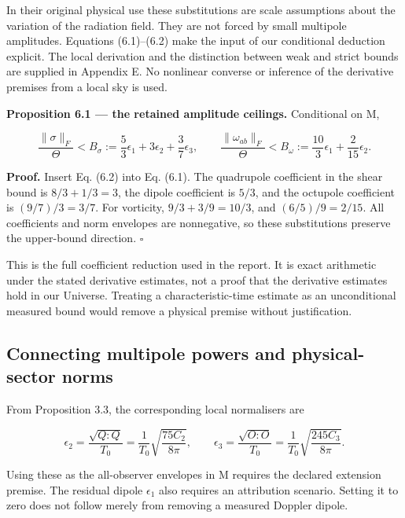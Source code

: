 \documentclass[
  11pt,
  a4paper]{article}
\begin{document}
In their original physical use these substitutions are scale assumptions about the variation of the radiation field. They are not forced by small multipole amplitudes. Equations (6.1)--(6.2) make the input of our conditional deduction explicit. The local derivation and the distinction between weak and strict bounds are supplied in Appendix E. No nonlinear converse or inference of the derivative premises from a local sky is used.

\textbf{Proposition 6.1 --- the retained amplitude ceilings.} Conditional on M,

\[
\frac{\|\sigma\|_F}{\Theta}<B_\sigma
:=\frac53\epsilon_1+3\epsilon_2+\frac37\epsilon_3,
\qquad
\frac{\|\omega_{ab}\|_F}{\Theta}<B_\omega
:=\frac{10}{3}\epsilon_1+\frac{2}{15}\epsilon_2.
\tag{6.3}
\]

\textbf{Proof.} Insert Eq. (6.2) into Eq. (6.1). The quadrupole coefficient in the shear bound is \(8/3+1/3=3\), the dipole coefficient is \(5/3\), and the octupole coefficient is \((9/7)/3=3/7\). For vorticity, \(9/3+3/9=10/3\), and \((6/5)/9=2/15\). All coefficients and norm envelopes are nonnegative, so these substitutions preserve the upper-bound direction. \(\square\)

This is the full coefficient reduction used in the report. It is exact arithmetic under the stated derivative estimates, not a proof that the derivative estimates hold in our Universe. Treating a characteristic-time estimate as an unconditional measured bound would remove a physical premise without justification.

\hypertarget{connecting-multipole-powers-and-physical-sector-norms}{%
\subsection{Connecting multipole powers and physical-sector norms}\label{connecting-multipole-powers-and-physical-sector-norms}}

From Proposition 3.3, the corresponding local normalisers are

\[
\epsilon_2=\frac{\sqrt{Q:Q}}{T_0}
=\frac1{T_0}\sqrt{\frac{75C_2}{8\pi}},\qquad
\epsilon_3=\frac{\sqrt{O:O}}{T_0}
=\frac1{T_0}\sqrt{\frac{245C_3}{8\pi}}.
\tag{6.4}
\]

Using these as the all-observer envelopes in M requires the declared extension premise. The residual dipole \(\epsilon_1\) also requires an attribution scenario. Setting it to zero does not follow merely from removing a measured Doppler dipole.
\end{document}
